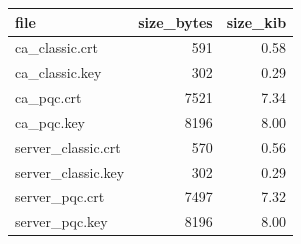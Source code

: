 \begin{tabular}{lrr}
	\toprule
	file & size\_bytes & size\_kib \\
	\midrule
	ca\_classic.crt & 591 & 0.58 \\
	ca\_classic.key & 302 & 0.29 \\
	ca\_pqc.crt & 7521 & 7.34 \\
	ca\_pqc.key & 8196 & 8.00 \\
	server\_classic.crt & 570 & 0.56 \\
	server\_classic.key & 302 & 0.29 \\
	server\_pqc.crt & 7497 & 7.32 \\
	server\_pqc.key & 8196 & 8.00 \\
	\bottomrule
\end{tabular}
